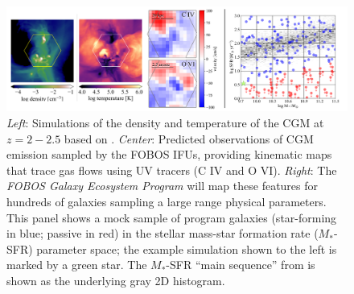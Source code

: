 \documentclass[11pt,a4paper,twoside,onecolumn,openany,final,oldfontcommands]{memoir}
\begin{document}

\begin{figure}
\includegraphics[width=\textwidth]{figs/msipProposalCgmCombo.pdf} 
\caption[CGM simulation examples and proposed sample]{\textit{Left}: Simulations of the density and temperature of the CGM at $z=2-2.5$ based on \citet{Corlies:2018aa}. \textit{Center}: Predicted observations of CGM emission sampled by the FOBOS IFUs, providing kinematic maps that trace gas flows using UV tracers (C IV and O VI).  \textit{Right}: The \textit{FOBOS Galaxy Ecosystem Program} will map these features for hundreds of galaxies sampling a large range physical parameters.  This panel shows a mock sample of program galaxies (star-forming in blue; passive in red) in the stellar mass-star formation rate ($M_*$-SFR) parameter space; the example simulation shown to the left is marked by a green star. The $M_*$-SFR ``main sequence'' from \citet{Whitaker:2012} is shown as the underlying gray 2D histogram.}
\label{fig:cgmsample}
\end{figure}



\end{document}
